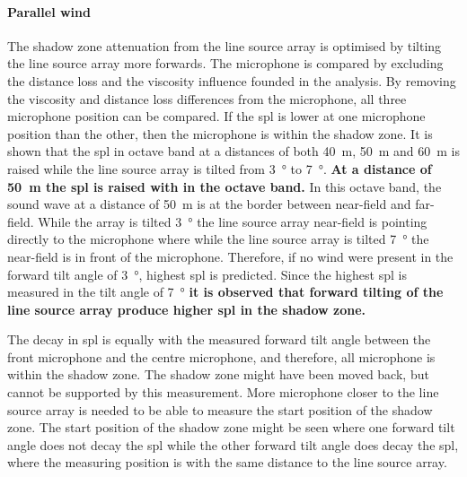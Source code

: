 \paragraph{Parallel wind}
The shadow zone attenuation from the line source array is optimised by tilting the line source array more forwards. The microphone is compared by excluding the distance loss and the viscosity influence founded in the analysis. By removing the viscosity and distance loss differences from the microphone, all three microphone position can be compared. If the \gls{spl} is lower at one microphone position than the other, then the microphone is within the shadow zone. It is shown that the \gls{spl} in octave band at a distances of both \SI{40}{\meter}, \SI{50}{\meter} and \SI{60}{\meter} is raised while the line source array is tilted from \SI{3}{\degree} to \SI{7}{\degree}. \textbf{At a distance of \SI{50}{\meter} the \gls{spl} is raised with  in the  octave band.} In this octave band, the sound wave at a distance of \SI{50}{\meter} is at the border between near-field and far-field. While the array is tilted \SI{3}{\degree} the line source array near-field is pointing directly to the microphone where while the line source array is tilted \SI{7}{\degree} the near-field is in front of the microphone. Therefore, if no wind were present in the forward tilt angle of \SI{3}{\degree}, highest \gls{spl} is predicted. Since the highest \gls{spl} is measured in the tilt angle of \SI{7}{\degree} \textbf{ it is observed that forward tilting of the line source array produce higher \gls{spl} in the shadow zone.} 

The decay in \gls{spl} is equally with the measured forward tilt angle between the front microphone and the centre microphone, and therefore, all microphone is within the shadow zone. The shadow zone might have been moved back, but cannot be supported by this measurement. More microphone closer to the line source array is needed to be able to measure the start position of the shadow zone. The start position of the shadow zone might be seen where one forward tilt angle does not decay the \gls{spl} while the other forward tilt angle does decay the \gls{spl}, where the measuring position is with the same distance to the line source array.